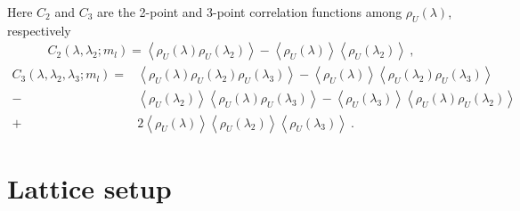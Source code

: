 \documentclass[a4paper,11pt]{article}
\numberwithin{equation}{section}
\begin{document}
Here $C_2$ and $C_3$ are the 2-point and 3-point correlation functions among $\rho_U(\lambda)$, respectively
\begin{equation}
\begin{aligned}
C_{2}\left(\lambda, \lambda_{2} ; m_{l}\right)=\left\langle\rho_{U}(\lambda) \rho_{U}\left(\lambda_{2}\right)\right\rangle-\left\langle\rho_{U}(\lambda)\right\rangle\left\langle\rho_{U}\left(\lambda_{2}\right)\right\rangle~,
\end{aligned}
\end{equation}
\begin{equation}
\begin{aligned}
C_{3}\left(\lambda, \lambda_{2}, \lambda_{3} ; m_{l}\right)
=&\left\langle\rho_{U}(\lambda) \rho_{U}\left(\lambda_{2}\right) \rho_{U}\left(\lambda_{3}\right)\right\rangle
-\left\langle\rho_{U}(\lambda)\right\rangle\left\langle\rho_{U}\left(\lambda_{2}\right) \rho_{U}\left(\lambda_{3}\right)\right\rangle 
\\ 
-&\left\langle\rho_{U}\left(\lambda_{2}\right)\right\rangle\left\langle\rho_{U}(\lambda) \rho_{U}\left(\lambda_{3}\right)\right\rangle
-\left\langle\rho_{U}\left(\lambda_{3}\right)\right\rangle\left\langle\rho_{U}(\lambda) \rho_{U}\left(\lambda_{2}\right)\right\rangle 
\\ 
+&2\left\langle\rho_{U}(\lambda)\right\rangle\left\langle\rho_{U}\left(\lambda_{2}\right)\right\rangle\left\langle\rho_{U}\left(\lambda_{3}\right)\right\rangle~.
\end{aligned}
\end{equation}

















\section{Lattice setup}
\end{document}
